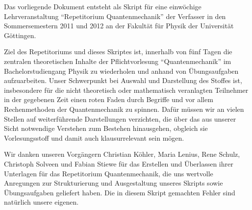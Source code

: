 Das vorliegende Dokument entsteht als Skript f\"ur eine einw\"ochige Lehrveranstaltung \enquote{Repetitorium Quantenmechanik}  der Verfasser in den Sommersemestern 2011 und 2012 an der Fakult\"at f\"ur Physik der Universit\"at G\"ottingen.

Ziel des Repetitoriums und dieses Skriptes ist, innerhalb von f\"unf Tagen die zentralen theoretischen Inhalte der Pflichtvorlesung \enquote{Quantenmechanik} im Bachelorstudiengang Physik zu wiederholen und anhand von \"Ubungsaufgaben aufzuarbeiten. Unser Schwerpunkt bei Auswahl und Darstellung des Stoffes ist, insbesondere f\"ur die nicht theoretisch oder mathematisch veranlagten Teilnehmer in der gegebenen Zeit einen roten Faden durch Begriffe und vor allem Rechenmethoden der Quantenmechanik zu spinnen. Daf\"ur m\"ussen wir an vielen Stellen auf weiterf\"uhrende Darstellungen verzichten, die \"uber das aus unserer Sicht notwendige Verstehen zum Bestehen hinausgehen, obgleich sie Vorlesungsstoff und damit auch klausurrelevant sein m\"ogen.

Wir danken unseren Vorg\"angern Christian K\"ohler, Maria Lenius, Rene Schulz, Christoph Solveen und Fabian Stiewe f\"ur das Erstellen und \"Uberlassen ihrer Unterlagen f\"ur das Repetitorium Quantenmechanik, die uns wertvolle Anregungen zur Strukturierung und Ausgestaltung unseres Skripts sowie \"Ubungsaufgaben geliefert haben. Die in diesem Skript gemachten Fehler sind nat\"urlich unsere eigenen.
